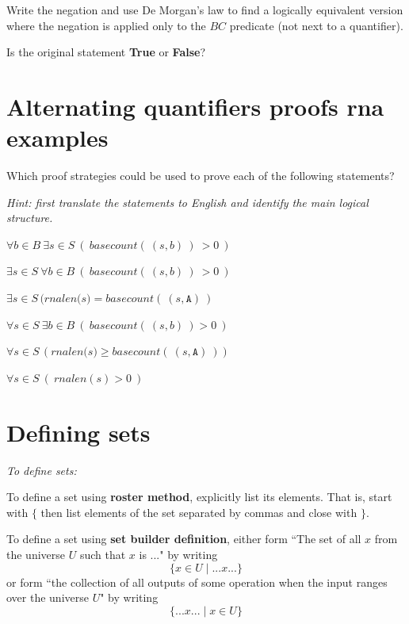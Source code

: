 \documentclass[12pt, oneside]{article}
\newcommand{\A}[0]{\texttt{A}}
\begin{document}
Write the negation and use De Morgan's law to find a 
logically equivalent version where the negation is applied only to the 
$BC$ predicate (not next to a quantifier).

\vspace{60pt}


Is the original statement {\bf True} or {\bf False}?



\vfill
 \vfill
\section*{Alternating quantifiers proofs rna examples}


Which proof strategies could be used to prove each of the following statements?

{\it Hint: first translate the statements to English and identify the main logical structure.}


$\forall b \in B~\exists s \in S~(~basecount(~(s,b)~)~ > 0~)$

\vfill

$\exists s \in S~\forall b \in B~(~basecount(~(s,b)~)~ > 0~)$

\vfill

$\exists s \in S \, (\textit{rnalen(s)} = \textit{basecount}(~(s, \A)~)$

\vfill

$\forall s \in S ~\exists b\in B ~(~basecount(~(s,b)~) > 0~)$

\vfill

$\forall s \in S \, (\textit{rnalen(s)} \geq \textit{basecount}(~(s, \A)~))$

\vfill

$\forall s \in S~(~rnalen(s) > 0~)$

\vfill
 \vfill
\section*{Defining sets}


{\it To define sets:}

To define a set using {\bf roster method}, explicitly list its elements. That is,
start with $\{$ then list elements of 
the set separated by commas and close with $\}$.

\vfill

To define a set using {\bf set builder definition}, either form 
``The set of all $x$ from the universe $U$ such that $x$ is ..." by writing
\[\{x \in U \mid ...x... \}\]
or form ``the collection of all outputs of some operation when the input ranges over the universe $U$"
by writing
\[\{ ...x... \mid x\in U \}\]
\end{document}
